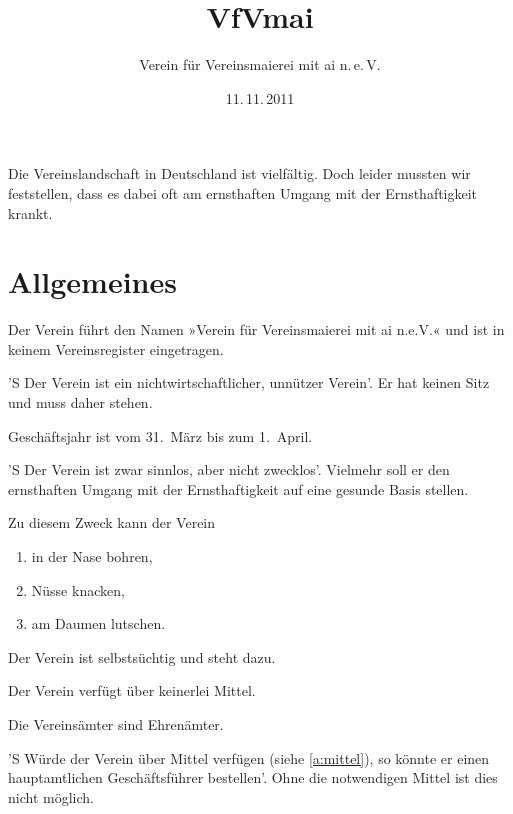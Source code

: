 \documentclass[fontsize=12pt,parskip=half]
              {scrartcl}
\begin{document}
\subject{Satzung}
\title{VfVmai}
\subtitle{Verein für Vereinsmaierei mit ai n.\,e.\,V.}
\date{11.\,11.\,2011}
\maketitle

\tableofcontents


Die Vereinslandschaft in Deutschland ist vielfältig.
Doch leider mussten wir feststellen, dass es dabei oft
am ernsthaften Umgang mit der Ernsthaftigkeit krankt.

\appendix

\section{Allgemeines}

\begin{contract}

Der Verein führt den Namen »Verein für Vereinsmaierei mit 
ai n.e.V.« und ist in keinem Vereinsregister eingetragen.

'S Der Verein ist ein nichtwirtschaftlicher, unnützer
Verein'. Er hat keinen Sitz und muss daher stehen.

Geschäftsjahr ist vom 31.~März bis zum 1.~April.


'S Der Verein ist zwar sinnlos, aber nicht zwecklos'.
Vielmehr soll er den ernsthaften Umgang mit der
Ernsthaftigkeit auf eine gesunde Basis stellen.

Zu diesem Zweck kann der Verein
\begin{enumerate}[\qquad a)]
\item in der Nase bohren,
\item Nüsse knacken,
\item am Daumen lutschen.
\end{enumerate}

Der Verein ist selbstsüchtig und steht dazu.

Der Verein verfügt über keinerlei Mittel.\label{a:mittel}


Die Vereinsämter sind Ehrenämter.

'S Würde der Verein über Mittel verfügen 
(siehe \ref{a:mittel}), so könnte er einen
hauptamtlichen Geschäftsführer bestellen'. Ohne
die notwendigen Mittel ist dies nicht möglich.

\label{p.maier}
\end{contract}
\end{document}
